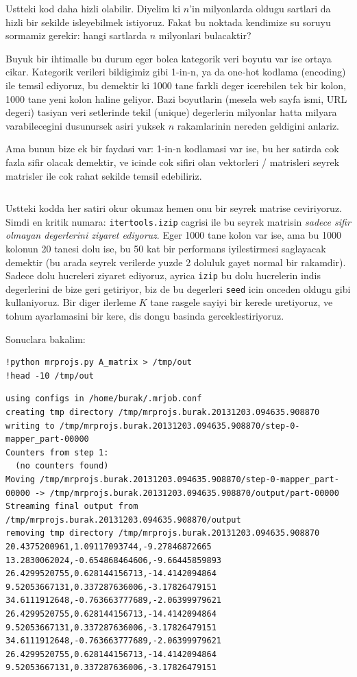 \documentclass[12pt,fleqn]{article}\usepackage{../common}
\begin{document}
Ustteki kod daha hizli olabilir. Diyelim ki $n$'in milyonlarda oldugu
sartlari da hizli bir sekilde isleyebilmek istiyoruz. Fakat bu noktada
kendimize su soruyu sormamiz gerekir: hangi sartlarda $n$ milyonlari
bulacaktir?

Buyuk bir ihtimalle bu durum eger bolca kategorik veri boyutu var ise
ortaya cikar. Kategorik verileri bildigimiz gibi 1-in-n, ya da one-hot
kodlama (encoding) ile temsil ediyoruz, bu demektir ki 1000 tane
farkli deger icerebilen tek bir kolon, 1000 tane yeni kolon haline
geliyor. Bazi boyutlarin (mesela web sayfa ismi, URL degeri) tasiyan
veri setlerinde tekil (unique) degerlerin milyonlar hatta milyara
varabilecegini dusunursek asiri yuksek $n$ rakamlarinin nereden
geldigini anlariz.

Ama bunun bize ek bir faydasi var: 1-in-n kodlamasi var ise, bu her
satirda cok fazla sifir olacak demektir, ve icinde cok sifiri olan
vektorleri / matrisleri seyrek matrisler ile cok rahat sekilde temsil
edebiliriz.

\inputminted{python}{mrprojs.py}

Ustteki kodda her satiri okur okumaz hemen onu bir seyrek matrise
ceviriyoruz. Simdi en kritik numara: \verb!itertools.izip!
cagrisi ile bu seyrek matrisin {\em sadece sifir olmayan degerlerini
ziyaret ediyoruz}. Eger 1000 tane kolon var ise, ama bu 1000
kolonun 20 tanesi dolu ise, bu 50 kat bir performans iyilestirmesi
saglayacak demektir (bu arada seyrek verilerde yuzde 2 doluluk gayet
normal bir rakamdir). Sadece dolu hucreleri ziyaret ediyoruz, ayrica
\verb!izip! bu dolu hucrelerin indis degerlerini de bize geri
getiriyor, biz de bu degerleri \verb!seed! icin onceden oldugu
gibi kullaniyoruz. Bir diger ilerleme $K$ tane rasgele sayiyi bir
kerede uretiyoruz, ve tohum ayarlamasini bir kere, dis dongu basinda
gerceklestiriyoruz. 

Sonuclara bakalim:

\begin{verbatim}
!python mrprojs.py A_matrix > /tmp/out
!head -10 /tmp/out
\end{verbatim}

\begin{verbatim}
using configs in /home/burak/.mrjob.conf
creating tmp directory /tmp/mrprojs.burak.20131203.094635.908870
writing to /tmp/mrprojs.burak.20131203.094635.908870/step-0-mapper_part-00000
Counters from step 1:
  (no counters found)
Moving /tmp/mrprojs.burak.20131203.094635.908870/step-0-mapper_part-00000 -> /tmp/mrprojs.burak.20131203.094635.908870/output/part-00000
Streaming final output from /tmp/mrprojs.burak.20131203.094635.908870/output
removing tmp directory /tmp/mrprojs.burak.20131203.094635.908870
20.4375200961,1.09117093744,-9.27846872665
13.2830062024,-0.654868464606,-9.66445859893
26.4299520755,0.628144156713,-14.4142094864
9.52053667131,0.337287636006,-3.17826479151
34.6111912648,-0.763663777689,-2.06399979621
26.4299520755,0.628144156713,-14.4142094864
9.52053667131,0.337287636006,-3.17826479151
34.6111912648,-0.763663777689,-2.06399979621
26.4299520755,0.628144156713,-14.4142094864
9.52053667131,0.337287636006,-3.17826479151
\end{verbatim}
\end{document}
